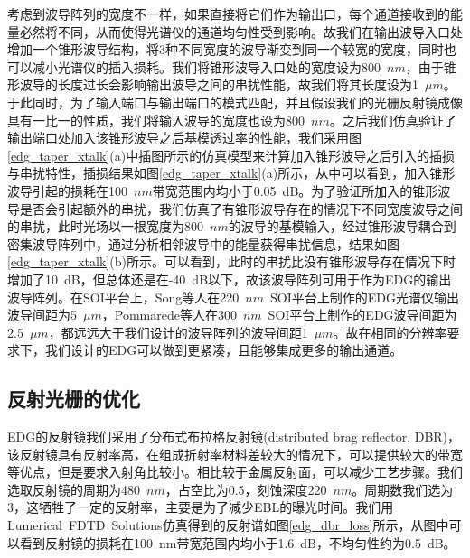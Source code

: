 考虑到波导阵列的宽度不一样，如果直接将它们作为输出口，每个通道接收到的能量必然将不同，从而使得光谱仪的通道均匀性受到影响。故我们在输出波导入口处增加一个锥形波导结构，将3种不同宽度的波导渐变到同一个较宽的宽度，同时也可以减小光谱仪的插入损耗。我们将锥形波导入口处的宽度设为800~$nm$，由于锥形波导的长度过长会影响输出波导之间的串扰性能，故我们将其长度设为1~$\mu m$。于此同时，为了输入端口与输出端口的模式匹配，并且假设我们的光栅反射镜成像具有一比一的性质，我们将输入波导的宽度也设为800~$nm$。之后我们仿真验证了输出端口处加入该锥形波导之后基模透过率的性能，我们采用图\ref{edg_taper_xtalk}(a)中插图所示的仿真模型来计算加入锥形波导之后引入的插损与串扰特性，插损结果如图\ref{edg_taper_xtalk}(a)所示，从中可以看到，加入锥形波导引起的损耗在100~$nm$带宽范围内均小于0.05~dB。为了验证所加入的锥形波导是否会引起额外的串扰，我们仿真了有锥形波导存在的情况下不同宽度波导之间的串扰，此时光场以一根宽度为800~$nm$的波导的基模输入，经过锥形波导耦合到密集波导阵列中，通过分析相邻波导中的能量获得串扰信息，结果如图\ref{edg_taper_xtalk}(b)所示。可以看到，此时的串扰比没有锥形波导存在情况下时增加了10~dB，但总体还是在-40~dB以下，故该波导阵列可用于作为EDG的输出波导阵列。在SOI平台上，Song等人\cite{song2012chip}在220~$nm$~SOI平台上制作的EDG光谱仪输出波导间距为5~$\mu m$，Pommarede等人\cite{pommarede201716}在300~$nm$~SOI平台上制作的EDG波导间距为2.5~$\mu m$，都远远大于我们设计的波导阵列的波导间距1~$\mu m$。故在相同的分辨率要求下，我们设计的EDG可以做到更紧凑，且能够集成更多的输出通道。

\subsection{反射光栅的优化}
EDG的反射镜我们采用了分布式布拉格反射镜(distributed brag reflector, DBR)，该反射镜具有反射率高，在组成折射率材料差较大的情况下，可以提供较大的带宽等优点\cite{lycett2013perfect}，但是要求入射角比较小。相比较于金属反射面，可以减少工艺步骤。我们选取反射镜的周期为480~$nm$，占空比为0.5，刻蚀深度220~$nm$。周期数我们选为3，这牺牲了一定的反射率，主要是为了减少EBL的曝光时间。我们用Lumerical~FDTD~Solutions\cite{fdtdsolution}仿真得到的反射谱如图\ref{edg_dbr_loss}所示，从图中可以看到反射镜的损耗在100~nm带宽范围内均小于1.6~dB，不均匀性约为0.5~dB。

